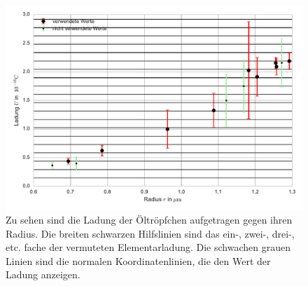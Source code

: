 \begin{figure}[h!]
	\centering
	\includegraphics[width = \textwidth]{Plot.pdf}
	\caption{Zu sehen sind die Ladung der Öltröpfchen aufgetragen gegen ihren Radius. Die breiten schwarzen Hilfslinien sind das ein-, zwei-, drei-, etc. fache der vermuteten Elementarladung. Die schwachen grauen Linien sind die normalen Koordinatenlinien, die den Wert der Ladung anzeigen.}
	\label{fig:Elementarladung}
\end{figure}